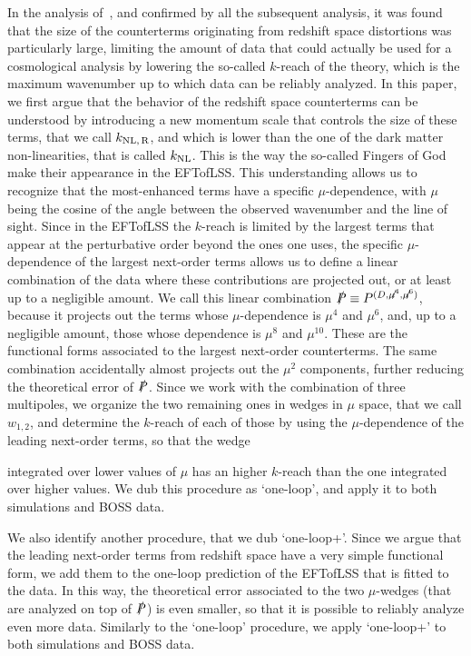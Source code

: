 \documentclass[12pt,a4paper]{article}
\def\PA{\slashed{P}}
\renewcommand{\(}{\left(}
\renewcommand{\)}{\right)}
\def\knl{{k_{\rm NL}}}
\def\knlr{{k_{\rm NL,\,R}}}
\begin{document}
In the analysis of~\cite{DAmico:2019fhj,Ivanov:2019pdj,Colas:2019ret}, and confirmed by all the subsequent analysis, it was found that the size of the counterterms originating from redshift space distortions was particularly large, limiting the amount of data that could actually be used for a cosmological analysis by lowering the so-called $k$-reach of the theory, which is the maximum wavenumber up to which data can be {reliably} analyzed. In this paper, we first argue that the behavior of the redshift space counterterms can be understood by introducing a new momentum scale that controls the size of these terms, that we call $\knlr$, and which is lower than the one of the dark matter non-linearities, that is called $\knl$. This is the way the so-called Fingers of God make their appearance in the EFTofLSS. This understanding allows us to recognize that the most-enhanced terms have a specific $\mu$-dependence, with $\mu$ being the {cosine of the} angle between the observed wavenumber and the line of sight. Since in the EFTofLSS the $k$-reach is limited by the largest terms that appear at the perturbative order beyond the ones one uses, the specific $\mu$-dependence of the largest next-order terms allows us to define a linear combination of the data where these contributions are projected out, or at least up to a negligible amount. We call this linear combination $\PA\equiv P^{(D,\slashed{\mu^4},\slashed{\mu^6})}$, because it projects out the terms whose $\mu$-dependence is $\mu^4$ and $\mu^6$, and, up to a negligible amount, those whose dependence is $\mu^8$ and $\mu^{10}$. These are the functional forms associated to the largest next-order counterterms. The same combination accidentally almost projects out the $\mu^2$ components, further reducing the theoretical error of $\PA$. Since we work with the combination of three multipoles, we organize the two remaining ones in wedges in $\mu$ space, that we call $w_{1,2}$, and determine the $k$-reach of each of those by using the $\mu$-dependence of the leading next-order terms, so that the wedge {integrated over  lower values of $\mu$ has an higher $k$-reach than the one {integrated over} higher values. We dub this procedure as `one-loop', and apply it to both simulations and {BOSS} data. 

We also identify another procedure, that we dub `one-loop+'. Since we argue that the leading next-order terms from redshift space have a very simple functional form, we add them to the one-loop prediction of the EFTofLSS that is fitted to the data. In this way, the theoretical error associated to the two $\mu$-wedges (that are analyzed on top of $\PA$) is even smaller, so that it is possible to {reliably} analyze even more data. Similarly to the `one-loop' procedure, we apply `one-loop+' to both simulations and {BOSS} data.






}
\end{document}

